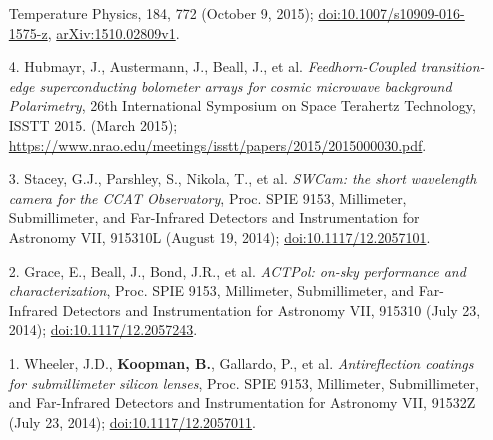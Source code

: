 \documentclass[margin,line]{res}
\begin{document}
\begin{resume}
\begin{enumerate}
    Temperature Physics, 184, 772 (October 9, 2015);
    \href{http://dx.doi.org/10.1007/s10909-016-1575-z}{doi:10.1007/s10909-016-1575-z},
    \href{http://arxiv.org/abs/1510.02809v1}{arXiv:1510.02809v1}.
\item[{4.}] Hubmayr, J., Austermann, J., Beall, J., et al. \textit{Feedhorn-Coupled
    transition-edge superconducting bolometer arrays for cosmic microwave
    background Polarimetry}, 26th International Symposium on Space Terahertz
    Technology, ISSTT 2015. (March 2015);\\
    \href{https://www.nrao.edu/meetings/isstt/papers/2015/2015000030.pdf}{https://www.nrao.edu/meetings/isstt/papers/2015/2015000030.pdf}.
\item[{3.}] Stacey, G.J., Parshley, S., Nikola, T., et al.
    \textit{SWCam: the short wavelength camera for the CCAT Observatory},
    Proc. SPIE 9153, Millimeter, Submillimeter, and Far-Infrared Detectors and Instrumentation for Astronomy VII, 
    915310L (August 19, 2014); \href{http://dx.doi.org/10.1117/12.2057101}{doi:10.1117/12.2057101}.
\item[{2.}] Grace, E., Beall, J., Bond, J.R., et al.
    \textit{ACTPol: on-sky performance and characterization},
    Proc. SPIE 9153, Millimeter, Submillimeter, and Far-Infrared Detectors and Instrumentation for Astronomy VII, 
    915310 (July 23, 2014); \href{http://dx.doi.org/10.1117/12.2057243}{doi:10.1117/12.2057243}.
\item[{1.}] Wheeler, J.D., \textbf{Koopman, B.}, Gallardo, P., et al.
    \textit{Antireflection coatings for submillimeter silicon lenses},
    Proc. SPIE 9153, Millimeter, Submillimeter, and Far-Infrared Detectors and Instrumentation for Astronomy VII, 
    91532Z (July 23, 2014); \href{http://dx.doi.org/10.1117/12.2057011}{doi:10.1117/12.2057011}.
\end{enumerate}


\end{resume}
\end{document}
